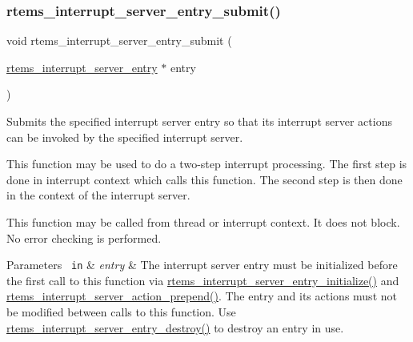 \subsubsection{\texorpdfstring{rtems\_interrupt\_server\_entry\_submit()}{rtems\_interrupt\_server\_entry\_submit()}}
{\footnotesize\ttfamily void rtems\+\_\+interrupt\+\_\+server\+\_\+entry\+\_\+submit (\begin{DoxyParamCaption}\item[{\mbox{\hyperlink{structrtems__interrupt__server__entry}{rtems\+\_\+interrupt\+\_\+server\+\_\+entry}} $\ast$}]{entry }\end{DoxyParamCaption})}



Submits the specified interrupt server entry so that its interrupt server actions can be invoked by the specified interrupt server. 

This function may be used to do a two-\/step interrupt processing. The first step is done in interrupt context which calls this function. The second step is then done in the context of the interrupt server.

This function may be called from thread or interrupt context. It does not block. No error checking is performed.


\begin{DoxyParams}[1]{Parameters}
\mbox{\texttt{ in}}  & {\em entry} & The interrupt server entry must be initialized before the first call to this function via \mbox{\hyperlink{group__rtems__interrupt__extension_ga86ea2e100b06ad64fa320381bb34d2d1}{rtems\+\_\+interrupt\+\_\+server\+\_\+entry\+\_\+initialize()}} and \mbox{\hyperlink{group__rtems__interrupt__extension_ga734c36a08deae3d40775f46e526526be}{rtems\+\_\+interrupt\+\_\+server\+\_\+action\+\_\+prepend()}}. The entry and its actions must not be modified between calls to this function. Use \mbox{\hyperlink{group__rtems__interrupt__extension_ga8926167fe72ef23335bd242b0380c038}{rtems\+\_\+interrupt\+\_\+server\+\_\+entry\+\_\+destroy()}} to destroy an entry in use. \\
\hline
\end{DoxyParams}
\mbox{\label{group__rtems__interrupt__extension_ga591084dbfb85313364d6591fef1768bc}} 
